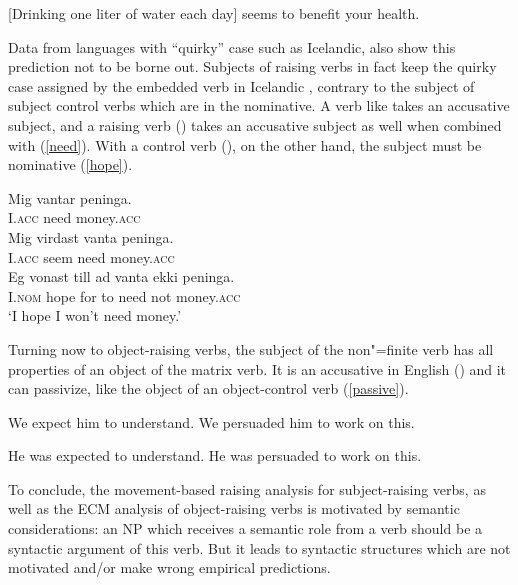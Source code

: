 \documentclass[output=paper
                ,modfonts
                ,nonflat
	        ,collection
	        ,collectionchapter
	        ,collectiontoclongg
 	        ,biblatex
                ,babelshorthands
                ,newtxmath
                ,draftmode
                ,colorlinks, citecolor=brown
]{./langsci/langscibook}
\begin{document}
	
\ea 
{}[Drinking one liter of water each day] seems to benefit your health.
\z

Data from languages with ``quirky'' case such as Icelandic, also show this prediction not to be borne out.  Subjects of raising verbs in fact keep the quirky case assigned by the embedded verb in Icelandic \citep{Zaenenetal1985}, contrary to the subject of subject control verbs which are in the nominative. A verb like  takes an accusative subject, and a raising verb () takes an accusative subject as well when combined with  (\ref{need}). With a control verb (), on the other hand, the subject must be nominative (\ref{hope}).

\begin{exe}
\ex \begin{xlist}
\ex \gll Mig vantar peninga. \\
I.\textsc{acc} need money.\textsc{acc} \\
\ex \gll Mig virdast vanta peninga. \label{need} \\
I.\textsc{acc} seem need money.\textsc{acc} \\
\ex \gll Eg vonast till ad vanta ekki peninga. \label{hope} \\
I.\textsc{nom} hope for to need not money.\textsc{acc} \\
\glt `I hope I won't need money.'
	\end{xlist}	
	
\end{exe}

Turning now to object-raising verbs, the subject of the non"=finite verb has all properties of an object of the matrix verb. It is an accusative in English () and it can passivize, like the object of an object-control verb (\ref{passive}).

\begin{exe}
\ex
\begin{xlist}
\ex We expect him to understand.
\ex  We persuaded him to work on this.
\end{xlist}
\ex \begin{xlist} \label{passive}
\ex  He was expected to understand.
\ex  He was persuaded to work on this.
\end{xlist}
	
\end{exe}

To conclude, the movement-based raising analysis for subject-raising verbs, as well as the ECM analysis of object-raising verbs is motivated by semantic considerations: an NP which receives a semantic role from a verb should be a syntactic argument of this verb. But it leads to syntactic structures which are not motivated and/or make wrong empirical predictions.
 
\end{document}
